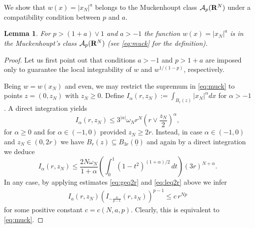 \documentclass[10pt,reqno]{amsart}
\numberwithin{equation}{section}
\def\R{{\bf R}}
\def\xn{x_N}
\newtheorem{lemma}[theorem]{Lemma}
\begin{document}
We show that $w(x)=|\xn|^a$ belongs to the Muckenhoupt class
$\mathcal{A}_p(\R^N)$ under a compatibility condition
between $p$ and $a$. %
\begin{lemma}\label{w-muck}
  For $p>(1+a)\vee 1$ and $a>-1$ the function $w(x)=|\xn|^a$
is in the Muckenhoupt's class $\mathcal{A}_p(\R^N)$ (see
\eqref{eq:muck} for the definition).
\end{lemma}
\begin{proof}
Let us first point out that conditions $a>-1$ and $p>1+a$
are imposed only to guarantee the local integrability of
$w$ and $w^{1/(1-p)}$, respectively.

Being $w=w(\xn)$ and even, we may restrict the supremum in
\eqref{eq:muck} to points $z=(0,z_N)$ with $z_N\geq 0$.
Define $I_\alpha(r,z_N):=\int_{B_r(z)}|\xn|^\alpha dx$
for $\alpha>-1$.
A direct integration %
yields
\begin{equation}
  \label{eq:geq2r}
  I_\alpha(r,z_N)\leq 3^{|\alpha|}\omega_Nr^N
\left(r\vee\frac{z_N}2\right)^\alpha,
\end{equation}
for $\alpha\geq 0$ and for $\alpha\in(-1,0)$ provided $z_N\geq 2r$.
Instead, in case  $\alpha\in(-1,0)$ and $z_N\in(0,2r)$ we have
$B_r(z)\subseteq B_{3r}(\underline{0})$ and again by a
direct integration we deduce
\begin{equation}
  \label{eq:leq2r}
 I_\alpha(r,z_N)\leq \frac{2N\omega_N}{1+\alpha}
\left(\int_0^1(1-t^2)^{(1+\alpha)/2}\,dt\right)(3r)^{N+\alpha}.
\end{equation}
In any case, by applying estimates \eqref{eq:geq2r} and \eqref{eq:leq2r}
above we infer
\begin{eqnarray*}
 I_a(r,z_N)\left(I_{-\frac a{p-1}}(r,z_N)\right)^{p-1}\leq
c\,r^{Np}
\end{eqnarray*}
for some positive constant $c=c(N,a,p)$. Clearly, this is equivalent to
\eqref{eq:muck}.
\end{proof}
\end{document}

